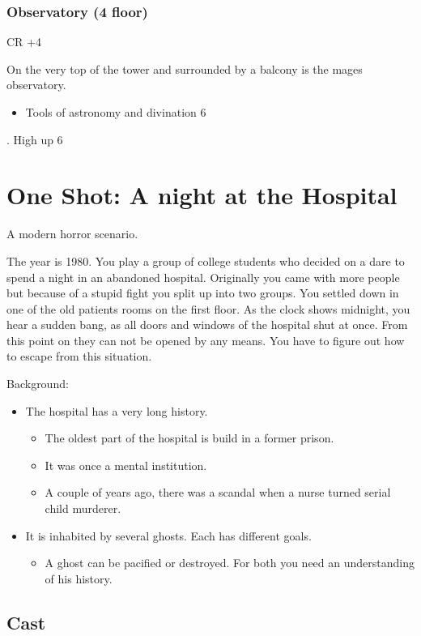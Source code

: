\documentclass[11pt]{article}
\begin{document}
{\subsubsection{Observatory (4 floor)}
\label{sec:orgdde4300}
CR +4

On the very top of the tower and surrounded by a balcony is the mages observatory.

\begin{itemize}
\item Tools of astronomy and divination 6
\end{itemize}
. High up 6
\section{One Shot: A night at the Hospital}
\label{sec:org6cd52aa}

A modern horror scenario.

The year is 1980. You play a group of college students who decided on a dare to spend a night in an abandoned hospital. Originally you came with more people but because of a stupid fight you split up into two groups. You settled down in one of the old patients rooms on the first floor. As the clock shows midnight, you hear a sudden bang, as all doors and windows of the hospital shut at once. From this point on they can not be opened by any means. You have to figure out how to escape from this situation. 

Background:
\begin{itemize}
\item The hospital has a very long history.
\begin{itemize}
\item The oldest part of the hospital is build in a former prison.
\item It was once a mental institution.
\item A couple of years ago, there was a scandal when a nurse turned serial child murderer.
\end{itemize}
\item It is inhabited by several ghosts. Each has different goals.
\begin{itemize}
\item A ghost can be pacified or destroyed. For both you need an understanding of his history.
\end{itemize}
\end{itemize}
\subsection{Cast}
\label{sec:orgb25320c}

}
\end{document}
